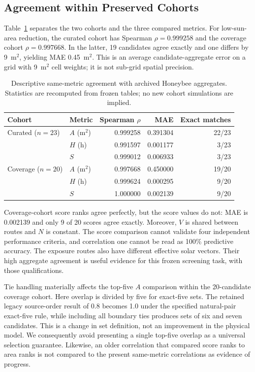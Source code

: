 \documentclass{llncs}
\begin{document}




\subsection{Agreement within Preserved Cohorts}
Table~\ref{tab:agreement} separates the two cohorts and the three compared metrics. For low-sun-area reduction, the curated cohort has Spearman $\rho=0.999258$ and the coverage cohort $\rho=0.997668$. In the latter, 19 candidates agree exactly and one differs by 9~m$^2$, yielding MAE 0.45~m$^2$. This is an average candidate-aggregate error on a grid with 9~m$^2$ cell weights; it is not sub-grid spatial precision.

\begin{table}[tbp]
\caption{Descriptive same-metric agreement with archived Honeybee aggregates. Statistics are recomputed from frozen tables; no new cohort simulations are implied.}
\label{tab:agreement}\centering
\begin{tabular}{llrrr}\toprule
Cohort & Metric & Spearman $\rho$ & MAE & Exact matches\\\midrule
Curated ($n=23$) & $A$ (m$^2$) & 0.999258 & 0.391304 & 22/23\\
 & $H$ (h) & 0.991597 & 0.001177 & 3/23\\
 & $S$ & 0.999012 & 0.006933 & 3/23\\
Coverage ($n=20$) & $A$ (m$^2$) & 0.997668 & 0.450000 & 19/20\\
 & $H$ (h) & 0.999624 & 0.000295 & 9/20\\
 & $S$ & 1.000000 & 0.002139 & 9/20\\\bottomrule
\end{tabular}
\end{table}


Coverage-cohort score ranks agree perfectly, but the score values do not: MAE is 0.002139 and only 9 of 20 scores agree exactly. Moreover, $V$ is shared between routes and $N$ is constant. The score comparison cannot validate four independent performance criteria, and correlation one cannot be read as 100\% predictive accuracy. The exposure routes also have different effective solar vectors. Their high aggregate agreement is useful evidence for this frozen screening task, with those qualifications.

Tie handling materially affects the top-five $A$ comparison within the 20-candidate coverage cohort. Here overlap is divided by five for exact-five sets. The retained legacy source-order result of 0.8 becomes 1.0 under the specified natural-pair exact-five rule, while including all boundary ties produces sets of six and seven candidates. This is a change in set definition, not an improvement in the physical model. We consequently avoid presenting a single top-five overlap as a universal selection guarantee. Likewise, an older correlation that compared score ranks to area ranks is not compared to the present same-metric correlations as evidence of progress.
\end{document}
